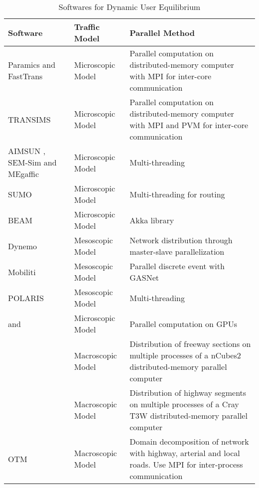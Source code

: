 \begin{table*}[htbp]
\centering
\begin{tabular} { | l | p{25mm} | p{80mm}| } 
	\hline
	\hline
	\textbf{Software} & \textbf{Traffic Model} & \textbf{Parallel Method}\\ \hline
	Paramics \cite{cameron1996paramics} and FastTrans \cite{thulasidasan2009accelerating}    & Microscopic Model & Parallel computation on distributed-memory computer with MPI for inter-core communication \\ \hline
	TRANSIMS \cite{robertson1969transyt}     & Microscopic Model & Parallel computation on distributed-memory computer with MPI and PVM for inter-core communication \\ \hline
	AIMSUN \cite{ferrer1993aimsun2}, SEM-Sim \cite{aydt2013multi} and MEgaffic \cite{osogami2012research}     & Microscopic Model & Multi-threading \\ \hline
	SUMO \cite{behrisch2011sumo}    & Microscopic Model & Multi-threading for routing \\ \hline
	BEAM \cite{aboutBeam}    & Microscopic Model & Akka library \\ \hline
	Dynemo \cite{nokel2002parallel}  & Mesoscopic Model & Network distribution through master-slave parallelization \\ \hline
	Mobiliti \cite{chan2018mobiliti}     & Mesoscopic Model & Parallel discrete event with GASNet \\ \hline
	POLARIS \cite{auld2016polaris}     & Mesoscopic Model & Multi-threading \\ \hline
	\cite{xu2014mesoscopic,song2017supporting}and \cite{strippgen2009multi}     & Microscopic Model & Parallel computation on GPUs \\ \hline
	\cite{chronopoulos1998real}     & Macroscopic Model & Distribution of freeway sections on multiple processes of a nCubes2 distributed-memory parallel computer \\ \hline
	\cite{johnston1999parallelization}     & Macroscopic Model & Distribution of highway segments on multiple processes of a Cray T3W distributed-memory parallel computer \\ \hline
	OTM     & Macroscopic Model & Domain decomposition of network with highway, arterial and local roads. Use MPI for inter-process communication \\ \hline
\end{tabular}
\caption{Softwares for Dynamic User Equilibrium}
\label{tab:softwares}
\end{table*}

